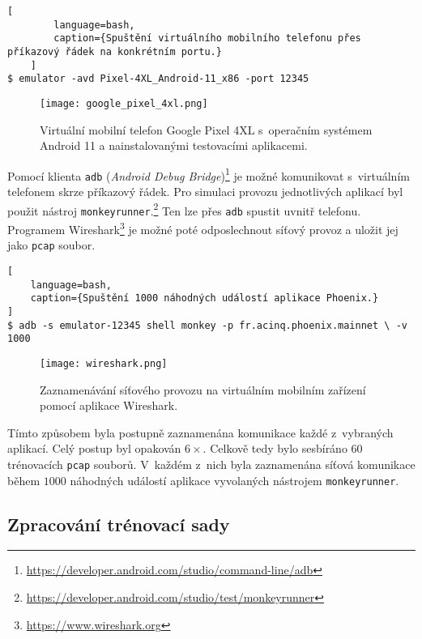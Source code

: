 \begin{center}
    \begin{lstlisting}[
        language=bash,
        caption={Spuštění virtuálního mobilního telefonu přes příkazový řádek na konkrétním portu.}
    ]
$ emulator -avd Pixel-4XL_Android-11_x86 -port 12345
\end{lstlisting}
\end{center}

\begin{figure}[H]
    \centering
    \texttt{[image: google\_pixel\_4xl.png]}
    \caption{Virtuální mobilní telefon Google Pixel 4XL s~operačním systémem Android 11 a nainstalovanými testovacími aplikacemi.}
    \label{fig_google_pixel_4xl}
\end{figure}

Pomocí klienta \texttt{adb} (\textit{Android Debug Bridge})\footnote{\url{https://developer.android.com/studio/command-line/adb}} je možné komunikovat s~virtuálním telefonem skrze příkazový řádek. Pro simulaci provozu jednotlivých aplikací byl použit nástroj \texttt{monkeyrunner}.\footnote{\url{https://developer.android.com/studio/test/monkeyrunner}} Ten lze přes \texttt{adb} spustit uvnitř telefonu. Programem Wireshark\footnote{\url{https://www.wireshark.org}} je možné poté odposlechnout síťový provoz a uložit jej jako \texttt{pcap} soubor.

\begin{center}
    \begin{lstlisting}[
    language=bash,
    caption={Spuštění 1000 náhodných událostí aplikace Phoenix.}
]
$ adb -s emulator-12345 shell monkey -p fr.acinq.phoenix.mainnet \ -v 1000
\end{lstlisting}
\end{center}

\begin{figure}[H]
    \centering
    \texttt{[image: wireshark.png]}
    \caption{Zaznamenávání síťového provozu na virtuálním mobilním zařízení pomocí aplikace Wireshark.}
    \label{fig_wireshark}
\end{figure}

Tímto způsobem byla postupně zaznamenána komunikace každé z~vybraných aplikací. Celý postup byl opakován $6\times$. Celkově tedy bylo sesbíráno $60$ trénovacích \texttt{pcap} souborů. V~každém z~nich byla zaznamenána síťová komunikace během $1000$ náhodných událostí aplikace vyvolaných nástrojem \texttt{monkeyrunner}.

\subsection{Zpracování trénovací sady}

